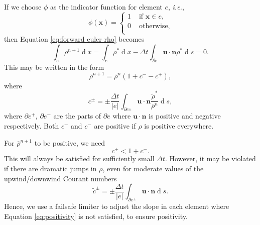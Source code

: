\documentclass{article}
\def\MM#1{\boldsymbol{#1}}
\def\MM#1{\boldsymbol{#1}}
\DeclareMathOperator{\diff}{d}
\begin{document}
If we choose $\phi$ as the indicator function for element $e$, \emph{i.e.},
\begin{equation}
\phi(\MM{x}) = \left \{
\begin{array}{rl}
1 & \mbox{ if } \MM{x}\in e, \\
0 & \mbox{ otherwise,} \\
\end{array}\right.
\end{equation}
then Equation \eqref{eq:forward euler rho} becomes
\begin{equation}
\int_e \rho^{n+1} \diff x 
= \int_e \rho^* \diff x 
- \Delta t\int_{\partial e} \MM{u}\cdot\MM{n} 
\rho^* \diff s = 0.
\end{equation}
This may be written in the form
\begin{equation}
\label{eq:rho n+1}
\overline{\rho}^{n+1} = \overline{\rho}^n\left(1 + c^- - c^+\right),
\end{equation}
where 
\begin{equation}
  c^{\pm} = \pm\frac{\Delta t}{|e|}
\int_{\partial e^{\pm}} \MM{u}\cdot\MM{n} 
\frac{\tilde{\rho}^*}{\overline{\rho}^n}\diff s,
\end{equation}
where $\partial e^+$, $\partial e^-$ are the parts of $\partial e$
where $\MM{u}\cdot\MM{n}$ is positive and negative respectively.  Both
$c^+$ and $c^-$ are positive if $\rho$ is positive everywhere. 

For $\overline{\rho}^{n+1}$ to be positive, we need
\begin{equation}
\label{eq:positivity}
c^+ < 1 + c^-.
\end{equation}
This will always be satisfied for sufficiently small $\Delta t$. 
However, it may be violated if there are dramatic jumps in $\rho$, even
for moderate values of the upwind/downwind Courant numbers
\begin{equation}
\tilde{c}^{\pm} = \pm\frac{\Delta t}{|e|}\int_{\partial e^\pm}
\MM{u}\cdot\MM{n} \diff s.
\end{equation}
Hence, we use a failsafe limiter to adjust the slope in each element
where Equation \eqref{eq:positivity} is not satisfied, to ensure
positivity.
\end{document}
